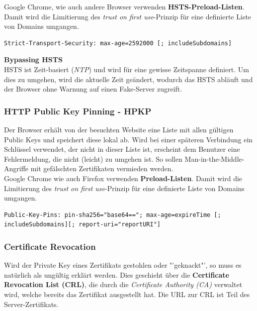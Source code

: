 Google Chrome, wie auch andere Browser verwenden \textbf{HSTS-Preload-Listen}. Damit wird die Limitierung des \textit{trust on first use}-Prinzip für eine definierte Liste von Domains umgangen.

\begin{lstlisting}[language={},caption=HSTS-Header mit einer max-age von 30 Tagen]
Strict-Transport-Security: max-age=2592000 [; includeSubdomains]
\end{lstlisting}

\textbf{Bypassing HSTS}\\
HSTS ist Zeit-basiert (\textit{NTP}) und wird für eine gewisse Zeitspanne definiert. Um dies zu umgehen, wird die aktuelle Zeit geändert, wodurch das HSTS abläuft und der Browser ohne Warnung auf einen Fake-Server zugreift.

\subsubsection{HTTP Public Key Pinning - HPKP}
Der Browser erhält von der besuchten Website eine Liste mit allen gültigen Public Keys und speichert diese lokal ab. Wird bei einer späteren Verbindung ein Schlüssel verwendet, der nicht in dieser Liste ist, erscheint dem Benutzer eine Fehlermeldung, die nicht (leicht) zu umgehen ist. So sollen Man-in-the-Middle-Angriffe mit gefälschten Zertifikaten vermieden werden.\\

Google Chrome wie auch Firefox verwenden \textbf{Preload-Listen}. Damit wird die Limitierung des \textit{trust on first use}-Prinzip für eine definierte Liste von Domains umgangen.

\begin{lstlisting}[language={},caption=Beispiel des HPKP-Headers]
Public-Key-Pins: pin-sha256="base64=="; max-age=expireTime [; includeSubdomains][; report-uri="reportURI"]
\end{lstlisting}

\subsubsection{Certificate Revocation}
Wird der Private Key eines Zertifikats gestohlen oder "'geknackt"', so muss es natürlich als ungültig erklärt werden. Dies geschieht über die \textbf{Certificate Revocation List (CRL)}, die durch die \textit{Certificate Authority (CA)} verwaltet wird, welche bereits das Zertifikat ausgestellt hat. Die URL zur CRL ist Teil des Server-Zertifikats.\\

